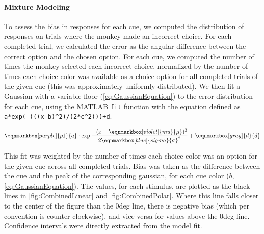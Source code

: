 \paragraph{Mixture Modeling}\label{para:MixtureModeling}

To assess the bias in responses for each cue, we computed the distribution of responses on trials where the monkey made an incorrect choice. 
For each completed trial, we calculated the error as the angular difference between the correct option and the chosen option. 
For each cue, we computed the number of times the monkey selected each incorrect choice, normalized by the number of times each choice color was available as a choice option for all completed trials of the given cue (this was approximately uniformly distributed). 
We then fit a Gaussian with a variable floor (\autoref{eq:GaussianEquation}) to the error distribution for each cue, using the MATLAB \lstinline{fit} function with the equation defined as \lstinline{a*exp(-(((x-b)^2)/(2*c^2)))+d}. 



\vspace{2em} 
\begin{equation} \label{eq:GaussianEquation}
    \eqnmarkbox[purple]{p1}{a}
    \cdot
    \exp
    \frac{-(x-
    \eqnmarkbox[violet]{mu}{\mu}
    )^2}{2 
    \eqnmarkbox[blue]{sigma}{\sigma}^2}
    +
    \eqnmarkbox[gray]{d}{d}        
\end{equation}

\vspace{2em} 

This fit was weighted by the number of times each choice color was an option for the given cue across all completed trials. 
Bias was taken as the difference between the cue and the peak of the corresponding gaussian, for each cue color ($b$, \autoref{eq:GaussianEquation}). 
The values, for each stimulus, are plotted as the black lines in \autoref{fig:CombinedLinear} and \autoref{fig:CombinedPolar}. 
Where this line falls closer to the center of the figure than the 0deg line, there is negative bias (which per convention is counter-clockwise), and vice versa for values above the 0deg line. Confidence intervals were directly extracted from the model fit.

